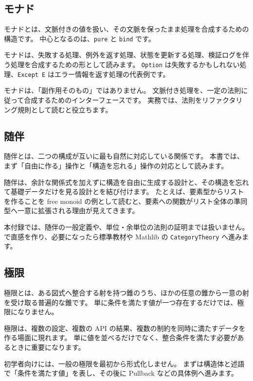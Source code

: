 \subsection{モナド}

モナドとは、文脈付きの値を扱い、その文脈を保ったまま処理を合成するための構造です。
中心となるのは、\texttt{pure} と \texttt{bind} です。

モナドは、失敗する処理、例外を返す処理、状態を更新する処理、検証ログを伴う処理を合成するための形として読みます。
\texttt{Option} は失敗するかもしれない処理、\texttt{Except E} はエラー情報を返す処理の代表例です。

モナドは、「副作用そのもの」ではありません。
文脈付き処理を、一定の法則に従って合成するためのインターフェースです。
実務では、法則をリファクタリング規則として読むと役立ちます。

\subsection{随伴}

随伴とは、二つの構成が互いに最も自然に対応している関係です。
本書では、まず「自由に作る」操作と「構造を忘れる」操作の対応として読みます。

随伴は、余計な関係式を加えずに構造を自由に生成する設計と、その構造を忘れて基礎データだけを見る設計とを結び付けます。
たとえば、要素型からリストを作ることを free monoid の例として読むと、要素への関数がリスト全体の準同型へ一意に拡張される理由が見えてきます。

本付録では、随伴の一般定義や、単位・余単位の法則の証明までは扱いません。
で直感を作り、必要になったら標準教材や Mathlib の \texttt{CategoryTheory} へ進みます。

\subsection{極限}

極限とは、ある図式へ整合する射を持つ錐のうち、ほかの任意の錐から一意の射を受け取る普遍的な錐です。
単に条件を満たす値が一つ存在するだけでは、極限になりません。

極限は、複数の設定、複数の API の結果、複数の制約を同時に満たすデータを作る場面に現れます。
単に値を並べるだけでなく、整合条件を満たす必要があるときに重要になります。

初学者向けには、一般の極限を最初から形式化しません。
まずは構造体と述語で「条件を満たす値」を表し、その後に Pullback などの具体例へ進みます。

